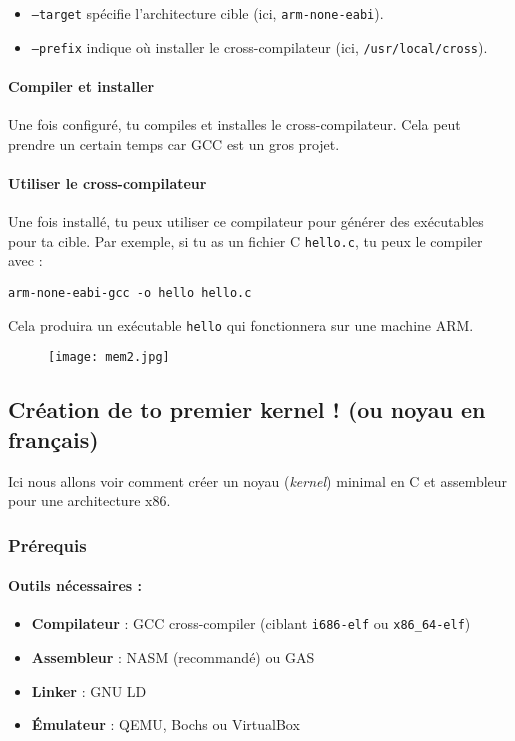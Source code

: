 \documentclass{article}
\begin{document}
\begin{itemize}
    \item \texttt{--target} spécifie l'architecture cible (ici, \texttt{arm-none-eabi}).
    \item \texttt{--prefix} indique où installer le cross-compilateur (ici, \texttt{/usr/local/cross}).
\end{itemize}

\paragraph{Compiler et installer}
Une fois configuré, tu compiles et installes le cross-compilateur. Cela peut prendre un certain temps car GCC est un gros projet.

\paragraph{Utiliser le cross-compilateur}
Une fois installé, tu peux utiliser ce compilateur pour générer des exécutables pour ta cible. Par exemple, si tu as un fichier C \texttt{hello.c}, tu peux le compiler avec :

\begin{lstlisting}
arm-none-eabi-gcc -o hello hello.c
\end{lstlisting}

Cela produira un exécutable \texttt{hello} qui fonctionnera sur une machine ARM.

\begin{figure}[h!]
    \centering
    \texttt{[image: mem2.jpg]}
    \label{fig:logo2}
\end{figure}



\subsection{Création de to premier kernel ! (ou noyau en français)}
Ici nous allons voir comment créer un noyau (\textit{kernel}) minimal en C et assembleur pour une architecture x86.
\subsubsection{Prérequis}
\paragraph{Outils nécessaires :}
\begin{itemize}
    \item \textbf{Compilateur} : GCC cross-compiler (ciblant \texttt{i686-elf} ou \texttt{x86\_64-elf})
    \item \textbf{Assembleur} : NASM (recommandé) ou GAS
    \item \textbf{Linker} : GNU LD
    \item \textbf{Émulateur} : QEMU, Bochs ou VirtualBox
\end{itemize}
\end{document}
